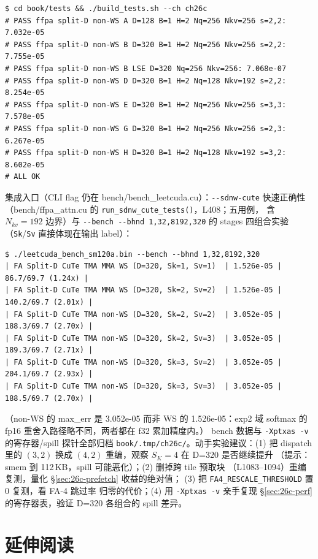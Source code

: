 \begin{lstlisting}[style=console]
$ cd book/tests && ./build_tests.sh --ch ch26c
# PASS ffpa split-D non-WS A D=128 B=1 H=2 Nq=256 Nkv=256 s=2,2: 7.032e-05
# PASS ffpa split-D non-WS B D=320 B=1 H=2 Nq=256 Nkv=256 s=2,2: 7.755e-05
# PASS ffpa split-D non-WS B LSE D=320 Nq=256 Nkv=256: 7.068e-07
# PASS ffpa split-D non-WS D D=320 B=1 H=2 Nq=128 Nkv=192 s=2,2: 8.254e-05
# PASS ffpa split-D non-WS E D=320 B=1 H=2 Nq=256 Nkv=256 s=3,3: 7.578e-05
# PASS ffpa split-D non-WS G D=320 B=1 H=2 Nq=256 Nkv=256 s=2,3: 6.267e-05
# PASS ffpa split-D non-WS H D=320 B=1 H=2 Nq=128 Nkv=192 s=3,2: 8.602e-05
# ALL OK
\end{lstlisting}

集成入口（CLI flag 仍在 bench/bench\_leetcuda.cu）：\texttt{-{}-sdnw-cute} 快速正确性
（bench/ffpa\_attn.cu 的 \texttt{run\_sdnw\_cute\_tests()}，L408；五用例，
含 $N_{kv}{=}192$ 边界）与 \texttt{-{}-bench -{}-bhnd 1,32,8192,320}
的 stages 四组合实验（\texttt{Sk}/\texttt{Sv} 直接体现在输出 label）：

\begin{lstlisting}[style=console]
$ ./leetcuda_bench_sm120a.bin --bench --bhnd 1,32,8192,320
| FA Split-D CuTe TMA MMA WS (D=320, Sk=1, Sv=1)  | 1.526e-05 |  86.7/69.7 (1.24x) |
| FA Split-D CuTe TMA MMA WS (D=320, Sk=2, Sv=2)  | 1.526e-05 | 140.2/69.7 (2.01x) |
| FA Split-D CuTe TMA non-WS (D=320, Sk=2, Sv=2)  | 3.052e-05 | 188.3/69.7 (2.70x) |
| FA Split-D CuTe TMA non-WS (D=320, Sk=2, Sv=3)  | 3.052e-05 | 189.3/69.7 (2.71x) |
| FA Split-D CuTe TMA non-WS (D=320, Sk=3, Sv=2)  | 3.052e-05 | 204.1/69.7 (2.93x) |
| FA Split-D CuTe TMA non-WS (D=320, Sk=3, Sv=3)  | 3.052e-05 | 188.5/69.7 (2.70x) |
\end{lstlisting}

（non-WS 的 max\_err 是 3.052e-05 而非 WS 的 1.526e-05：exp2 域
softmax 的 fp16 重舍入路径略不同，两者都在 f32 累加精度内。）
bench 数据与 \texttt{-Xptxas -v} 的寄存器/spill 探针全部归档
\texttt{book/.tmp/ch26c/}。动手实验建议：(1) 把 dispatch 里的
$(3,2)$ 换成 $(4,2)$ 重编，观察 $S_K{=}4$ 在 D=320 是否继续提升
（提示：smem 到 112\,KB，spill 可能恶化）；(2) 删掉跨 tile 预取块
（L1083--1094）重编复测，量化 \S\ref{sec:26c-prefetch} 收益的绝对值；
(3) 把 \texttt{FA4\_RESCALE\_THRESHOLD} 置 0 复测，看 FA-4 跳过率
归零的代价；(4) 用 \texttt{-Xptxas -v} 亲手复现 \S\ref{sec:26c-perf}
的寄存器表，验证 D=320 各组合的 spill 差异。

\section*{延伸阅读}

